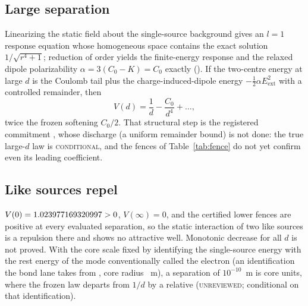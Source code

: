 \documentclass[aps,prd,onecolumn,amsmath,amssymb,longbibliography,floatfix,nofootinbib]{revtex4-2}
\newcommand{\st}[1]{\textsc{#1}}
\begin{document}
\subsection{Large separation}
Linearizing the static field about the single-source background gives an $l=1$ response equation whose homogeneous space contains the exact solution $1/\sqrt{r^4+1}$; reduction of order yields the finite-energy response and the relaxed dipole polarizability $\alpha=3(C_0-K)=C_0$ exactly (). If the two-centre energy at large $d$ is the Coulomb tail plus the charge-induced-dipole energy $-\tfrac12\alpha E_{\mathrm{ext}}^2$ with a controlled remainder, then
\begin{equation}
V(d)=\frac1d-\frac{C_0}{d^4}+\dots ,
\end{equation}
twice the frozen softening $C_0/2$. That structural step is the registered commitment , whose discharge (a uniform remainder bound) is not done: the true large-$d$ law is \st{conditional}, and the fences of Table~\ref{tab:fence} do not yet confirm even its leading coefficient.

\subsection{Like sources repel}
$V(0)=1.023977169320997>0$, $V(\infty)=0$, and the certified lower fences are positive at every evaluated separation, so the static interaction of two like sources is a repulsion there and shows no attractive well. Monotonic decrease for all $d$ is not proved. With the core scale fixed by identifying the single-source energy with the rest energy of the mode conventionally called the electron (an identification the bond lane takes from , core radius \BondCoreRadiusVal{}~m), a separation of $10^{-10}$~m is \BondScaleDVal{} core units, where the frozen law departs from $1/d$ by a relative \BondScaleRelVal{} (\st{unreviewed}; conditional on that identification).
\end{document}
